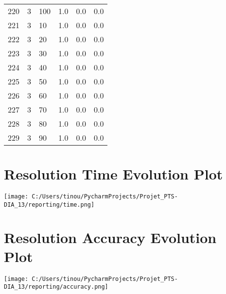 \documentclass{article}
\begin{document}
\begin{center}
\begin{tabular}{llllll}
220 &         3 &        100 &              1.0 &                       0.0 &                                   0.0 \\
221 &         3 &         10 &              1.0 &                       0.0 &                                   0.0 \\
222 &         3 &         20 &              1.0 &                       0.0 &                                   0.0 \\
223 &         3 &         30 &              1.0 &                       0.0 &                                   0.0 \\
224 &         3 &         40 &              1.0 &                       0.0 &                                   0.0 \\
225 &         3 &         50 &              1.0 &                       0.0 &                                   0.0 \\
226 &         3 &         60 &              1.0 &                       0.0 &                                   0.0 \\
227 &         3 &         70 &              1.0 &                       0.0 &                                   0.0 \\
228 &         3 &         80 &              1.0 &                       0.0 &                                   0.0 \\
229 &         3 &         90 &              1.0 &                       0.0 &                                   0.0 \\
\bottomrule
\end{tabular}
\end{center}
\newpage
\section{Resolution Time Evolution Plot}
\begin{center}
\texttt{[image: C:/Users/tinou/PycharmProjects/Projet\_PTS-DIA\_13/reporting/time.png]}
\end{center}
\section{Resolution Accuracy Evolution Plot}
\begin{center}
\texttt{[image: C:/Users/tinou/PycharmProjects/Projet\_PTS-DIA\_13/reporting/accuracy.png]}
\end{center}
\end{document}
